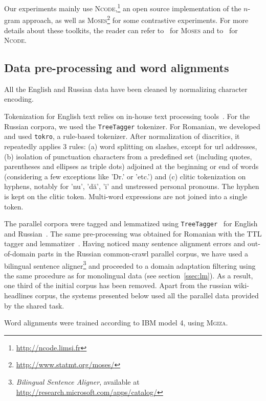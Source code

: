 \documentclass[11pt]{article}
\newcommand{\ncode}{\textsc{Ncode}\xspace}
\newcommand{\moses}{\textsc{Moses}\xspace}
\newcommand{\mgiza}{\textsc{Mgiza}\xspace}
\newcommand{\ngram}{\mbox{$n$-gram}\xspace}
\begin{document}
Our experiments mainly use
\ncode{},\footnote{\url{http://ncode.limsi.fr}} an open source
implementation of the \ngram{} approach, as well as
\moses\footnote{\url{http://www.statmt.org/moses/}} for some
contrastive experiments. For more details about these toolkits, the
reader can refer to~\cite{koehn07Moses} for \moses{} and
to~\cite{Crego11ncode} for \ncode.

\subsection{Data pre-processing and word alignments}

All the English and Russian data have been cleaned by normalizing
character encoding. 

Tokenization for English text relies on in-house text processing
tools~\cite{Dechelotte08limsi}.  For the Russian corpora, we used the
\texttt{TreeTagger} tokenizer.  For Romanian, we developed and used
\texttt{tokro}, a rule-based tokenizer. After normalization of diacritics, it
repeatedly applies 3 rules: (a) word splitting on slashes, except for
url addresses, (b) isolation of punctuation characters from a
predefined set (including quotes, parentheses and ellipses as triple
dots) adjoined at the beginning or end of words (considering a few
exceptions like 'Dr.'  or 'etc.') and (c) clitic tokenization on
hyphens, notably for 'nu', 'd\u{a}', 'i' and unstressed
personal pronouns. The hyphen is kept on the clitic token. Multi-word
expressions are not joined into a single token.

The parallel corpora were tagged and lemmatized using \texttt{TreeTagger}~\cite{Schmid94treetagger} for
English and Russian~\cite{Sharoff11}. The same pre-processing was obtained for Romanian with
the TTL tagger and lemmatizer~\cite{Tufis_racai}.
Having noticed many sentence alignment errors and out-of-domain parts in
the Russian common-crawl parallel corpus, we have used a bilingual
sentence aligner\footnote{\emph{Bilingual Sentence Aligner}, available at \url{http://research.microsoft.com/apps/catalog/}}
and proceeded to a domain adaptation filtering using the same procedure as 
for monolingual data (see section~\ref{ssec:lm}).
As a result, one third of the initial corpus has been removed.
Apart from the russian wiki-headlines corpus, the systems presented
below used all the parallel data provided by the shared task.

Word alignments were trained according to IBM model 4, using \mgiza.
\end{document}
